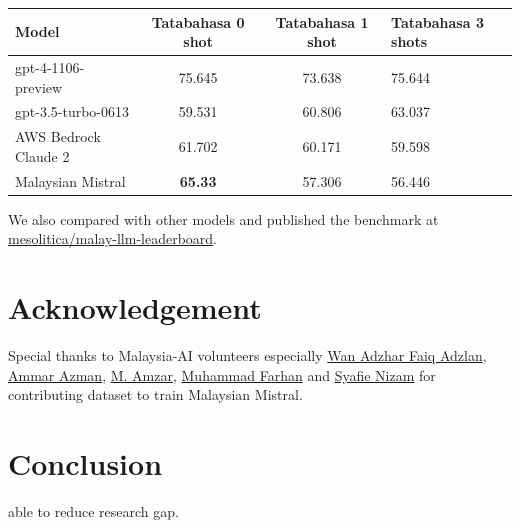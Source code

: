 \documentclass{article}
\begin{document}
\begin{table}[h]
  \centering
  \begin{tabular}{lccl}
    \hline
    \textbf{Model}       & \textbf{Tatabahasa 0 shot} & \textbf{Tatabahasa 1 shot} & \textbf{Tatabahasa 3 shots} \\
    \hline
    gpt-4-1106-preview   & 75.645                     & 73.638                     & 75.644                      \\
    gpt-3.5-turbo-0613   & 59.531                     & 60.806                     & 63.037                      \\
    AWS Bedrock Claude 2 & 61.702                     & 60.171                     & 59.598                      \\
    Malaysian Mistral    & \textbf{65.33}             & 57.306                     & 56.446                      \\
    \hline
  \end{tabular}
\end{table}

We also compared with other models and published the benchmark at \href{https://huggingface.co/spaces/mesolitica/malay-llm-leaderboard}{mesolitica/malay-llm-leaderboard}.

\section{Acknowledgement}

Special thanks to Malaysia-AI volunteers especially \href{https://www.linkedin.com/in/wan-adzhar-faiq-adzlan-19a27baa/}{Wan Adzhar Faiq Adzlan}, \href{https://www.linkedin.com/in/ammar-azman/}{Ammar Azman}, \href{https://www.linkedin.com/in/amzar96/}{M. Amzar}, \href{https://www.linkedin.com/in/muhammad-farhan-helmy-0529501a7/}{Muhammad Farhan} and \href{https://www.linkedin.com/in/syafie-nizam/}{Syafie Nizam} for contributing dataset to train Malaysian Mistral.

\section{Conclusion}

able to reduce research gap.

{}

\end{document}
